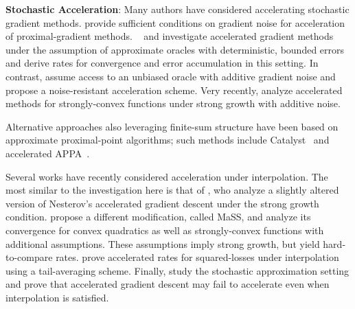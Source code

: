 \noindent \textbf{Stochastic Acceleration}: 
Many authors have considered accelerating stochastic gradient methods.
\citet{schmidt2011convergence} provide sufficient conditions on gradient noise for acceleration of proximal-gradient methods.
~\citep{aspremont2008approximate} and \citet{devolder2014first} investigate accelerated gradient methods under the assumption of approximate oracles with deterministic, bounded errors and derive rates for convergence and error accumulation in this setting.
In contrast, \citet{cohen2018acceleration} assume access to an unbiased oracle with additive gradient noise and propose a noise-resistant acceleration scheme.
Very recently, \citet{chen2020understanding} analyze accelerated methods for strongly-convex functions under strong growth with additive noise. 

Alternative approaches also leveraging finite-sum structure have been based on approximate proximal-point algorithms; such methods include Catalyst~\citep{lin2017catalyst} and accelerated APPA~\citep{frostig2015unregularizing}.

Several works have recently considered acceleration under interpolation.
The most similar to the investigation here is that of \citet{vaswani2019fast}, who analyze a slightly altered version of Nesterov's accelerated gradient descent under the strong growth condition. 
\citet{liu2020accelerating} propose a different modification, called MaSS, and analyze its convergence for convex quadratics as well as strongly-convex functions with additional assumptions. 
These assumptions imply strong growth, but yield hard-to-compare rates. 
\citet{jain2018accelerating} prove accelerated rates for squared-losses under interpolation using a tail-averaging scheme. 
Finally, \citet{assran2020convergence} study the stochastic approximation setting and prove that accelerated gradient descent may fail to accelerate even when interpolation is satisfied.\\

